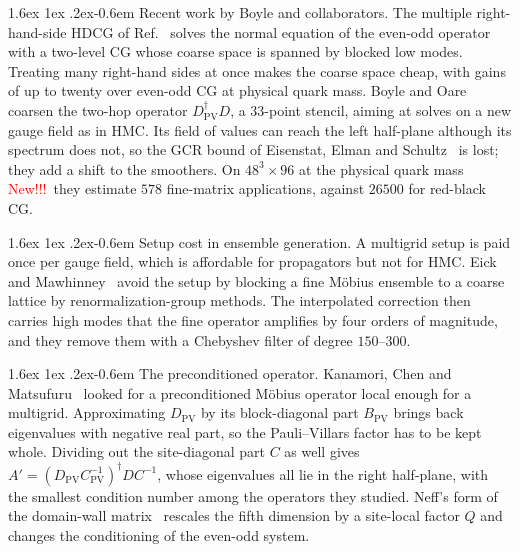 \documentclass[11pt,a4paper]{article}
\makeatletter
\newif\ifshownew \shownewtrue
\DeclareRobustCommand\New{\ifshownew\textcolor{red}{New!!!}\ \else\ignorespaces\fi}
\renewcommand\paragraph{\@startsection{paragraph}{4}{\z@}%
  {1.6ex \@plus 1ex \@minus .2ex}{-0.6em}%
  {\normalfont\normalsize\itshape}}
\numberwithin{equation}{section}
\newcommand{\dg}{^{\dagger}}
\newcommand{\Dpv}{D_{\mathrm{PV}}}
\newcommand{\Cpv}{C_{\mathrm{PV}}}
\newcommand{\Bpv}{B_{\mathrm{PV}}}
\makeatother
\begin{document}
\paragraph{Recent work by Boyle and collaborators.}
The multiple right-hand-side HDCG of Ref.~\cite{BoyleMRHS} solves the normal equation of the
even-odd operator with a two-level CG whose coarse space is spanned by blocked low modes. Treating
many right-hand sides at once makes the coarse space cheap, with gains of up to twenty over
even-odd CG at physical quark mass. Boyle and Oare~\cite{BoyleOare} coarsen the two-hop operator
$\Dpv\dg D$, a $33$-point stencil, aiming at solves on a new gauge field as in HMC. Its field of
values can reach the left half-plane although its spectrum does not, so the GCR bound of
Eisenstat, Elman and Schultz~\cite{ESS} is lost; they add a shift to the smoothers. On
$48^3\times96$ at the physical quark mass \New they estimate $578$ fine-matrix applications, against
$26500$ for red-black CG.

\paragraph{Setup cost in ensemble generation.}
A multigrid setup is paid once per gauge field, which is affordable for propagators but not for
HMC. Eick and Mawhinney~\cite{EickMawhinney} avoid the setup by blocking a fine M\"obius ensemble
to a coarse lattice by renormalization-group methods. The interpolated correction then carries
high modes that the fine operator amplifies by four orders of magnitude, and they remove them with
a Chebyshev filter of degree $150$--$300$.

\paragraph{The preconditioned operator.}
Kanamori, Chen and Matsufuru~\cite{KCM2024} looked for a preconditioned M\"obius operator local
enough for a multigrid. Approximating $\Dpv$ by its block-diagonal part $\Bpv$ brings back
eigenvalues with negative real part, so the Pauli--Villars factor has to be kept whole. Dividing out
the site-diagonal part $C$ as well gives $A'=(\Dpv\Cpv^{-1})\dg DC^{-1}$, whose eigenvalues all lie
in the right half-plane, with the smallest condition number among the operators they studied.
Neff's form of the domain-wall matrix~\cite{Neff,CKMN} rescales the fifth dimension by a site-local
factor $Q$ and changes the conditioning of the even-odd system.
\end{document}
